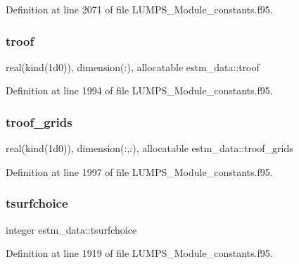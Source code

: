 Definition at line 2071 of file L\+U\+M\+P\+S\+\_\+\+Module\+\_\+constants.\+f95.

\mbox{\label{namespaceestm__data_a659039ba437449e2268beab9206c4bcf}} 
\subsubsection{\texorpdfstring{troof}{troof}}
{\footnotesize\ttfamily real(kind(1d0)), dimension(\+:), allocatable estm\+\_\+data\+::troof}



Definition at line 1994 of file L\+U\+M\+P\+S\+\_\+\+Module\+\_\+constants.\+f95.

\mbox{\label{namespaceestm__data_aae1edf5139be18aa0eb811a9ccc2985c}} 
\subsubsection{\texorpdfstring{troof\+\_\+grids}{troof\_grids}}
{\footnotesize\ttfamily real(kind(1d0)), dimension(\+:,\+:), allocatable estm\+\_\+data\+::troof\+\_\+grids}



Definition at line 1997 of file L\+U\+M\+P\+S\+\_\+\+Module\+\_\+constants.\+f95.

\mbox{\label{namespaceestm__data_a006f7851647528d67a1663c4287987cb}} 
\subsubsection{\texorpdfstring{tsurfchoice}{tsurfchoice}}
{\footnotesize\ttfamily integer estm\+\_\+data\+::tsurfchoice}



Definition at line 1919 of file L\+U\+M\+P\+S\+\_\+\+Module\+\_\+constants.\+f95.

\mbox{\label{namespaceestm__data_a333d0455fbb31ea62671cae82d2f3da7}} 

